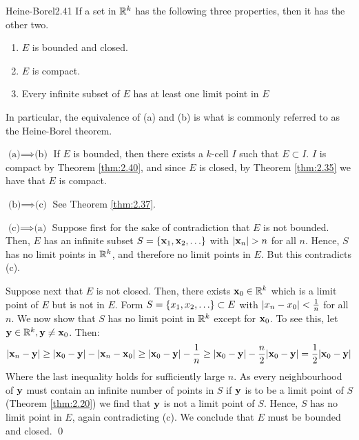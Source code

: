 \begin{theorem}{Heine-Borel}{2.41}
    If a set in $\mathbb{R}^k$ has the following three properties, then it has the other two.
    \begin{enumerate}
        \item $E$ is bounded and closed.
        \item $E$ is compact.
        \item Every infinite subset of $E$ has at least one limit point in $E$
    \end{enumerate}
    In particular, the equivalence of (a) and (b) is what is commonly referred to as the Heine-Borel theorem.
\end{theorem}
\begin{nproof}
    $\boxed{\text{(a)} \implies \text{(b)}}$ If $E$ is bounded, then there exists a $k$-cell $I$ such that $E \subset I$. $I$ is compact by Theorem \ref{thm:2.40}, and since $E$ is closed, by Theorem \ref{thm:2.35} we have that $E$ is compact.

    $\boxed{\text{(b)} \implies \text{(c)}}$ See Theorem \ref{thm:2.37}.

    $\boxed{\text{(c)} \implies \text{(a)}}$ Suppose first for the sake of contradiction that $E$ is not bounded. Then, $E$ has an infinite subset $S = \set{\ensuremath{\mathbf{x}}_1,\ensuremath{\mathbf{x}}_2, \ldots}$ with $\abs{\mathbf{x}_n} > n$ for all $n$. Hence, $S$ has no limit points in $\mathbb{R}^k$, and therefore no limit points in $E$. But this contradicts (c).

    Suppose next that $E$ is not closed. Then, there exists $\mathbf{x}_0 \in \mathbb{R}^k$ which is a limit point of $E$ but is not in $E$. Form $S = \set{x_1, x_2, \ldots} \subset E$ with $\abs{x_n - x_0} < \frac{1}{n}$ for all $n$. We now show that $S$ has no limit point in $\mathbb{R}^k$ except for $\mathbf{x}_0$. To see this, let $\mathbf{y} \in \mathbb{R}^k, \mathbf{y} \neq \mathbf{x}_0$. Then:
    \begin{align*}
        \abs{\mathbf{x}_n - \mathbf{y}} \geq \abs{\mathbf{x}_0 - \mathbf{y}} - \abs{\mathbf{x}_n - \mathbf{x}_0} \geq \abs{\mathbf{x}_0 - \mathbf{y}} - \frac{1}{n} \geq \abs{\mathbf{x}_0 - \mathbf{y}} - \frac{n}{2}\abs{\mathbf{x}_0 - \mathbf{y}} =  \frac{1}{2}\abs{\mathbf{x}_0 - \mathbf{y}}
    \end{align*}
    Where the last inequality holds for sufficiently large $n$. As every neighbourhood of $\mathbf{y}$ must contain an infinite number of points in $S$ if $\mathbf{y}$ is to be a limit point of $S$ (Theorem \ref{thm:2.20}) we find that $\mathbf{y}$ is not a limit point of $S$. Hence, $S$ has no limit point in $E$, again contradicting (c). We conclude that $E$ must be bounded and closed. \qed
\end{nproof}
